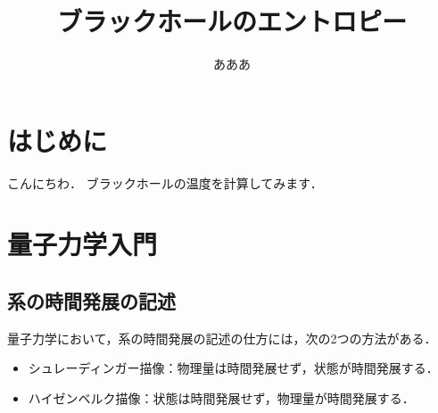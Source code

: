 \documentclass[uplatex,dvipdfmx]{vkaishi}
\begin{document}
\title{ブラックホールのエントロピー}%
\author[中山]{あああ}%

\maketitle %



\section*{はじめに}
こんにちわ．
ブラックホールの温度を計算してみます．

\section{量子力学入門}

\subsection{系の時間発展の記述}

量子力学において，系の時間発展の記述の仕方には，次の2つの方法がある．
\begin{itemize}
  \item シュレーディンガー描像：物理量は時間発展せず，状態が時間発展する．
  \item ハイゼンベルク描像：状態は時間発展せず，物理量が時間発展する．
\end{itemize}
\end{document}
